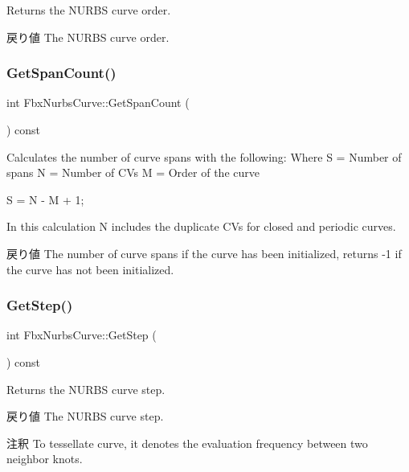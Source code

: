 Returns the N\+U\+R\+BS curve order. \begin{DoxyReturn}{戻り値}
The N\+U\+R\+BS curve order. 
\end{DoxyReturn}
\mbox{\label{class_fbx_nurbs_curve_acb1cf2016f20b2a0c8df382046c7d3ea}} 
\subsubsection{\texorpdfstring{Get\+Span\+Count()}{GetSpanCount()}}
{\footnotesize\ttfamily int Fbx\+Nurbs\+Curve\+::\+Get\+Span\+Count (\begin{DoxyParamCaption}{ }\end{DoxyParamCaption}) const}

Calculates the number of curve spans with the following\+: Where S = Number of spans N = Number of C\+Vs M = Order of the curve

S = N -\/ M + 1;

In this calculation N includes the duplicate C\+Vs for closed and periodic curves.

\begin{DoxyReturn}{戻り値}
The number of curve spans if the curve has been initialized, returns -\/1 if the curve has not been initialized. 
\end{DoxyReturn}
\mbox{\label{class_fbx_nurbs_curve_ac1ab9cfbac264cb9ab92dcc9b2149448}} 
\subsubsection{\texorpdfstring{Get\+Step()}{GetStep()}}
{\footnotesize\ttfamily int Fbx\+Nurbs\+Curve\+::\+Get\+Step (\begin{DoxyParamCaption}{ }\end{DoxyParamCaption}) const}

Returns the N\+U\+R\+BS curve step. \begin{DoxyReturn}{戻り値}
The N\+U\+R\+BS curve step. 
\end{DoxyReturn}
\begin{DoxyRemark}{注釈}
To tessellate curve, it denotes the evaluation frequency between two neighbor knots. 
\end{DoxyRemark}
\mbox{\label{class_fbx_nurbs_curve_a9dd3a14a0bc0aa298b58eb1b42ecd834}} 
